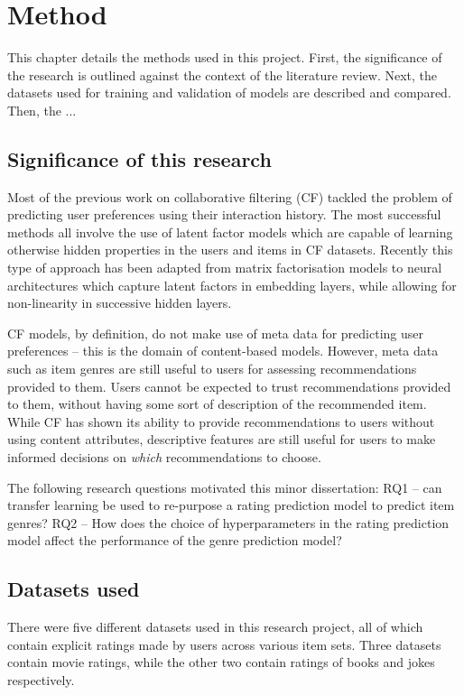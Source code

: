\chapter{Method}
This chapter details the methods used in this project. First, the significance of the research is outlined against the context of the literature review. Next, the datasets used for training and validation of models are described and compared. Then, the ...

\section{Significance of this research}
Most of the previous work on collaborative filtering (CF) tackled the problem of predicting user preferences using their interaction history. The most successful methods all involve the use of latent factor models which are capable of learning otherwise hidden properties in the users and items in CF datasets. Recently this type of approach has been adapted from matrix factorisation models to neural architectures which capture latent factors in embedding layers, while allowing for non-linearity in successive hidden layers. 

CF models, by definition, do not make use of meta data for predicting user preferences -- this is the domain of content-based models. However, meta data such as item genres are still useful to users for assessing recommendations provided to them. Users cannot be expected to trust recommendations provided to them, without having some sort of description of the recommended item. While CF has shown its ability to provide recommendations to users without using content attributes, descriptive features are still useful for users to make informed decisions on \textit{which} recommendations to choose.

The following research questions motivated this minor dissertation: RQ1 -- can transfer learning be used to re-purpose a rating prediction model to predict item genres? RQ2 -- How does the choice of hyperparameters in the rating prediction model affect the performance of the genre prediction model?

\section{Datasets used}
There were five different datasets used in this research project, all of which contain explicit ratings made by users across various item sets. Three datasets contain movie ratings, while the other two contain ratings of books and jokes respectively.

